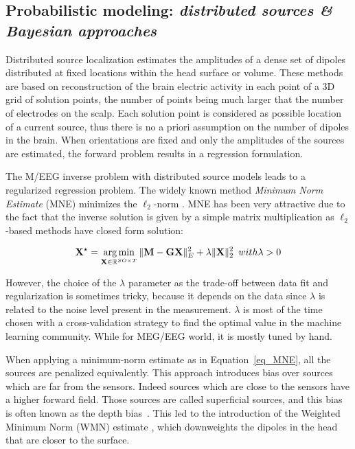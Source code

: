 \subsection{Probabilistic modeling: \textit{distributed sources \& Bayesian approaches}} \label{section_distributed}
Distributed source localization estimates the amplitudes of a dense set of dipoles distributed at fixed locations within the head surface or volume. These methods are based on reconstruction of the brain electric activity in each point of a 3D grid of solution points, the number of points being much larger that the number of electrodes on the scalp. Each solution point is considered as possible location of a current source, thus there is no a priori assumption on the number of dipoles in the brain.
When orientations are fixed and only the amplitudes of the sources are estimated, the forward problem results in a regression formulation.

The M/EEG inverse problem with distributed source models leads to a regularized regression problem. The widely known method \textit{Minimum Norm Estimate} (MNE) minimizes the $\ell_2$-norm \cite{hamalainen1994interpreting}. %
MNE has been very attractive due to the fact that the inverse solution is given by a simple matrix multiplication as $\ell_2$-based methods have closed form solution:

\begin{equation}\label{eq_MNE}
\mathbf{X}^\star = \mathop{\mathrm{arg}\,\mathrm{min}}_{\mathbf{X}\in\mathbb{R}^{SO\times T}} \|\mathbf{M}-\mathbf{GX}\|_E^2 + \lambda\|\mathbf{X}\|_2^2 \hspace{5pt} with \lambda > 0
\end{equation}

However, the choice of the $\lambda$ parameter as the trade-off between data fit and regularization is sometimes tricky, because it depends on the data since $\lambda$ is related to the noise level present in the measurement. $\lambda$ is most of the time chosen with a cross-validation strategy to find the optimal value in the machine learning community. While for MEG/EEG world, it is mostly tuned by hand.

When applying a minimum-norm estimate as in Equation~\eqref{eq_MNE}, all the sources are penalized equivalently. This approach introduces bias over sources which are far from the sensors. Indeed sources which are close to the sensors have a higher forward field. Those sources are called superficial sources, and this bias is often known as the depth bias~\cite{pascual1999review}. This led to the introduction of the Weighted Minimum Norm (WMN) estimate \cite{lin2006assessing}, which downweights the dipoles in the head that are closer to the surface. 

